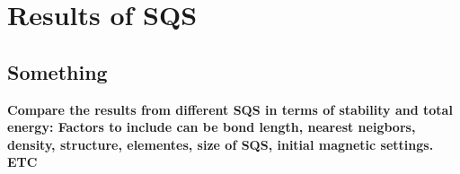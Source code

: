 \chapter{Results of SQS}
\label{sec:SQS_result}

\section{Something}
\textbf{Compare the results from different SQS in terms of stability and total energy: Factors to include can be bond length, nearest neigbors, density, structure, elementes, size of SQS, initial magnetic settings. ETC}